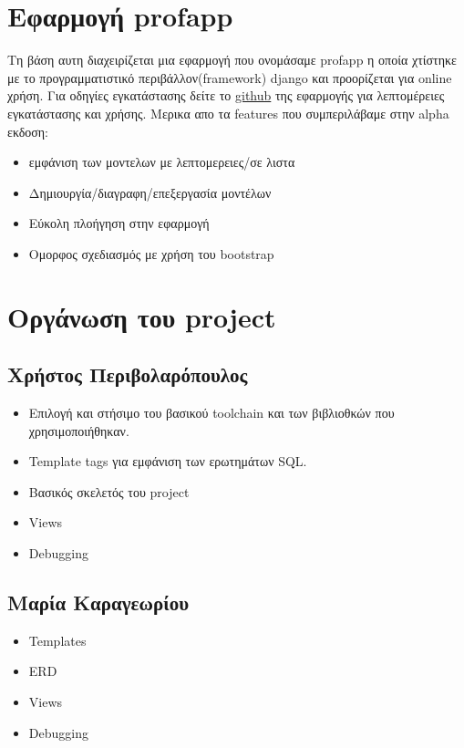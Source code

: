 \documentclass[11pt,a4paper]{article}
\begin{document}
\section{Εφαρμογή profapp}
\label{sec-3}
Τη βάση αυτη διαχειρίζεται μια εφαρμογή που ονομάσαμε profapp η
οποία χτίστηκε με το προγραμματιστικό περιβάλλον(framework) django
και προορίζεται για online χρήση. Για οδηγίες εγκατάστασης δείτε το
\href{http://github.com/fakedrake/django-profapp}{github} της εφαρμογής για λεπτομέρειες εγκατάστασης και
χρήσης. Μερικα απο τα features που συμπεριλάβαμε στην alpha εκδοση:

\begin{itemize}
\item εμφάνιση των μοντελων με λεπτομερειες/σε λιστα
\item Δημιουργία/διαγραφη/επεξεργασία μοντέλων
\item Εύκολη πλοήγηση στην εφαρμογή
\item Ομορφος σχεδιασμός με χρήση του bootstrap
\end{itemize}
\section{Οργάνωση του project}
\label{sec-4}
\subsection{Χρήστος Περιβολαρόπουλος}
\label{sec-4-1}
\begin{itemize}
\item Επιλογή και στήσιμο του βασικού toolchain και των βιβλιοθκών που
χρησιμοποιήθηκαν.
\item Template tags για εμφάνιση των ερωτημάτων SQL.
\item Βασικός σκελετός του project
\item Views
\item Debugging
\end{itemize}
\subsection{Μαρία Καραγεωρίου}
\label{sec-4-2}
\begin{itemize}
\item Templates
\item ERD
\item Views
\item Debugging
\end{itemize}
\end{document}

